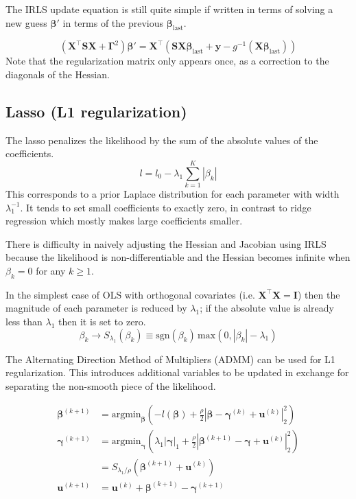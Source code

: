 \documentclass{article}
\newcommand{\bbeta}{\boldsymbol{\beta}}
\begin{document}
The IRLS update equation is still quite simple if written in terms of solving a
new guess \( \bbeta' \) in terms of the previous
\(\bbeta_\textrm{last}\).

\begin{equation}
\left( \mathbf{X}^\intercal \mathbf{S} \mathbf{X} + \boldsymbol{\Gamma}^2 \right)
\bbeta' = \mathbf{X}^\intercal \left( \mathbf{S}
\mathbf{X} \bbeta_\textrm{last} + \mathbf{y} -
g^{-1}(\mathbf{X}\bbeta_\textrm{last}) \right)
\end{equation}
Note that the regularization matrix only appears once, as a correction to the
diagonals of the Hessian.

\subsection{Lasso (L1 regularization)}

The lasso penalizes the likelihood by the sum of the absolute values of the coefficients.
\[ l = l_0 - \lambda_1 \sum_{k=1}^K \left| \beta_{k} \right| \]
This corresponds to a prior Laplace distribution for each parameter with width
\(\lambda_1^{-1}\). It tends to set small coefficients to exactly zero, in
contrast to ridge regression which mostly makes large coefficients smaller.

There is difficulty in naively adjusting the Hessian and Jacobian using IRLS
because the likelihood is non-differentiable and the Hessian becomes infinite
when \(\beta_k = 0\) for any \(k \geq 1\).

In the simplest case of OLS with orthogonal covariates (i.e. \(\mathbf{X}^\intercal \mathbf{X} = \mathbf{I}\)) then the magnitude of each parameter is reduced by \(\lambda_1\); if the absolute value is already less than \(\lambda_1\) then it is set to zero.
\[\beta_k \rightarrow S_{\lambda_1}\left(\beta_k\right) \equiv \textrm{sgn}(\beta_k) \, \textrm{max}\left(0, |\beta_k| - \lambda_1 \right)\]

The Alternating Direction Method of Multipliers (ADMM) can be used for L1
regularization. This introduces additional variables to be updated in exchange
for separating the non-smooth piece of the likelihood.

\begin{align}
\bbeta^{(k+1)} &= \textrm{argmin}_{\bbeta} \left( -l(\bbeta) + \frac{\rho}{2}\left| \bbeta - \boldsymbol{\gamma}^{(k)} + \mathbf{u}^{(k)} \right|_2^2 \right) \\
\boldsymbol{\gamma}^{(k+1)} &= \textrm{argmin}_{\boldsymbol{\gamma}} \left( \lambda_1 \left|\boldsymbol{\gamma}\right|_1 + \frac{\rho}{2}\left| \bbeta^{(k+1)} - \boldsymbol{\gamma} + \mathbf{u}^{(k)} \right|_2^2 \right) \\
&= S_{\lambda_1 / \rho} \left( \bbeta^{(k+1)} + \mathbf{u}^{(k)} \right) \\
\mathbf{u}^{(k+1)} &= \mathbf{u}^{(k)} + \bbeta^{(k+1)} - \boldsymbol{\gamma}^{(k+1)}
\end{align}
\end{document}
